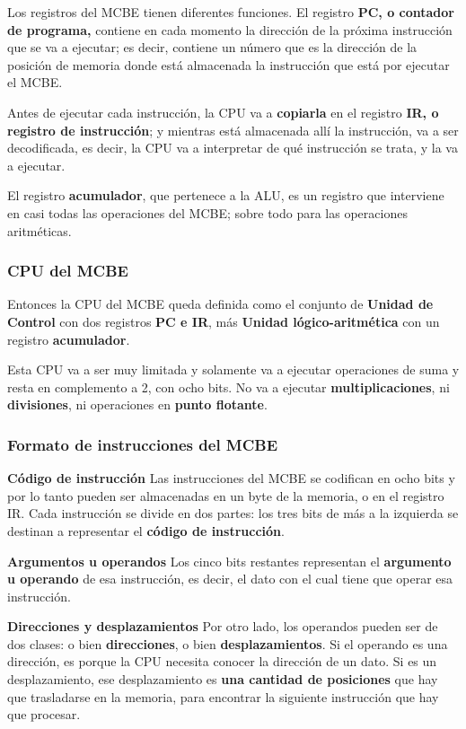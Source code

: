 \documentclass[spanish,A4,]{article}
\begin{document}
Los registros del MCBE tienen diferentes funciones. El registro
\textbf{PC, o contador de programa,} contiene en cada momento la
dirección de la próxima instrucción que se va a ejecutar; es decir,
contiene un número que es la dirección de la posición de memoria donde
está almacenada la instrucción que está por ejecutar el MCBE.

Antes de ejecutar cada instrucción, la CPU va a \textbf{copiarla} en el
registro \textbf{IR, o registro de instrucción}; y mientras está
almacenada allí la instrucción, va a ser decodificada, es decir, la CPU
va a interpretar de qué instrucción se trata, y la va a ejecutar.

El registro \textbf{acumulador}, que pertenece a la ALU, es un registro
que interviene en casi todas las operaciones del MCBE; sobre todo para
las operaciones aritméticas.

\subsubsection{CPU del MCBE}\label{cpu-del-mcbe}

Entonces la CPU del MCBE queda definida como el conjunto de
\textbf{Unidad de Control} con dos registros \textbf{PC e IR}, más
\textbf{Unidad lógico-aritmética} con un registro \textbf{acumulador}.

Esta CPU va a ser muy limitada y solamente va a ejecutar operaciones de
suma y resta en complemento a 2, con ocho bits. No va a ejecutar
\textbf{multiplicaciones}, ni \textbf{divisiones}, ni operaciones en
\textbf{punto flotante}.

\subsubsection{Formato de instrucciones del
MCBE}\label{formato-de-instrucciones-del-mcbe}

\textbf{Código de instrucción} Las instrucciones del MCBE se codifican
en ocho bits y por lo tanto pueden ser almacenadas en un byte de la
memoria, o en el registro IR. Cada instrucción se divide en dos partes:
los tres bits de más a la izquierda se destinan a representar el
\textbf{código de instrucción}.

\textbf{Argumentos u operandos} Los cinco bits restantes representan el
\textbf{argumento u operando} de esa instrucción, es decir, el dato con
el cual tiene que operar esa instrucción.

\textbf{Direcciones y desplazamientos} Por otro lado, los operandos
pueden ser de dos clases: o bien \textbf{direcciones}, o bien
\textbf{desplazamientos}. Si el operando es una dirección, es porque la
CPU necesita conocer la dirección de un dato. Si es un desplazamiento,
ese desplazamiento es \textbf{una cantidad de posiciones} que hay que
trasladarse en la memoria, para encontrar la siguiente instrucción que
hay que procesar.
\end{document}
